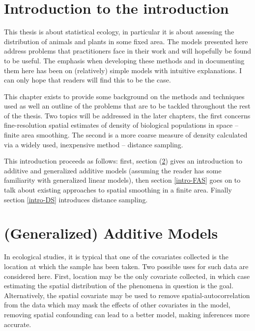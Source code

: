 \label{chap-intro}

\section{Introduction to the introduction}

This thesis is about statistical ecology, in particular it is about assessing the distribution of animals and plants in some fixed area. The models presented here address problems that practitioners face in their work and will hopefully be found to be useful. The emphasis when developing these methods and in documenting them here has been on (relatively) simple models with intuitive explanations. I can only hope that readers will find this to be the case.

This chapter exists to provide some background on the methods and techniques used as well an outline of the problems that are to be tackled throughout the rest of the thesis. Two topics will be addressed in the later chapters, the first concerns fine-resolution spatial estimates of density of biological populations in space -- finite area smoothing. The second is a more coarse measure of density calculated via a widely used, inexpensive method -- distance sampling.

This introduction proceeds as follows: first, section (\ref{intro-GAM}) gives an introduction to additive and generalized additive models (assuming the reader has some familiarity with generalized linear models), then section \ref{intro-FAS} goes on to talk about existing approaches to spatial smoothing in a finite area. Finally section \ref{intro-DS} introduces distance sampling.

\section{(Generalized) Additive Models}
\label{intro-GAM}

In ecological studies, it is typical that one of the covariates collected is the location at which the sample has been taken. Two possible uses for such data are considered here. First, location may be the only covariate collected, in which case estimating the spatial distribution of the phenomena in question is the goal. Alternatively, the spatial covariate may be used to remove spatial-autocorrelation from the data which may mask the effects of other covariates in the model, removing spatial confounding can lead to a better model, making inferences more accurate.

